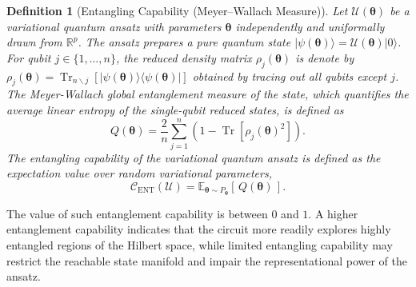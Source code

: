 \documentclass[twocolumn,
pra,aps,superscriptaddress,showpacs,amsmath,amssymb]{revtex4-2}
\newtheorem{definition}{Definition}
\begin{document}
\begin{definition}[Entangling Capability (Meyer--Wallach Measure)]
Let $\mathcal{U}(\bm{\theta})$ be a variational quantum ansatz with parameters $\bm{\theta}$ independently and uniformally drawn from $\mathbb{R}^p$. The ansatz prepares a pure quantum state
$|\psi(\bm{\theta})\rangle = \mathcal{U}(\bm{\theta}) |0\rangle$.
For qubit $j \in \{1,\dots,n\}$, the reduced density matrix $\rho_j(\bm{\theta})$ is denote by $ \rho_j(\bm{\theta}) = \operatorname{Tr}_{n\backslash j}\left[|\psi(\bm{\theta})\rangle\langle\psi(\bm{\theta})|\right]$ obtained by tracing out all qubits except $j$.  
The Meyer-Wallach global entanglement measure of the state, which quantifies the average linear entropy of the single-qubit reduced states, is defined as
\begin{equation}
Q(\bm{\theta})=\frac{2}{n}\sum_{j=1}^{n}\left(1 - \operatorname{Tr}\left[\rho_j(\bm{\theta})^2\right]
\right).
\end{equation}
The entangling capability of the variational quantum ansatz is defined as the expectation value over random variational parameters, 
\begin{equation}
\mathcal{C}_{\mathrm{ENT}}(\mathcal{U})= \mathbb{E}_{\bm{\theta} \sim P_{\bm{\theta}}}\left[\, Q(\bm{\theta}) \,\right].
\end{equation}
\end{definition}
The value of such entanglement capability is between $0$ and $1$. A higher entanglement capability indicates that the circuit more readily explores highly entangled regions of the Hilbert space, while limited entangling capability may restrict the reachable state manifold and impair the representational power of the ansatz.
\end{document}

